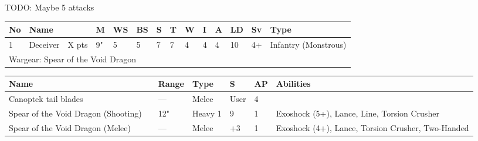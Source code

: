 \newpage
{}
TODO: Maybe 5 attacks

\noindent
\begin{tabular}{||m{10pt} m{95pt} m{30pt} m{11pt} m{11pt} m{11pt} m{11pt} m{11pt} m{11pt} m{11pt} m{11pt} m{11pt} m{11pt} m{125pt}||}
\hline
No & Name & & M & WS & BS & S & T & W & I & A & LD & Sv & Type \\
\hline
1 & Deceiver & X pts & 9" & 5 & 5 & 7 & 7 & 4 & 4 & 4 & 10 & 4+ & Infantry (Monstrous)\\
\hline
\hline
\multicolumn{14}{||Z{532 pt}||}{Wargear: Spear of the Void Dragon}\\
\hline
\end{tabular}

\noindent
\begin{tabular}{||m{140pt} m{0pt} m{31pt} m{55pt} m{12pt} m{12pt} m{210pt}||}
\hline
Name & & Range & Type & S & AP & Abilities \\
\hline
Canoptek tail blades & & — & Melee & User & 4 & \\
Spear of the Void Dragon (Shooting) &  & 12" & Heavy 1 & 9 & 1 & Exoshock (5+), Lance, Line, Torsion Crusher \\
Spear of the Void Dragon (Melee) &  & — & Melee & +3 & 1 & Exoshock (4+), Lance, Torsion Crusher, Two-Handed \\
\hline
\end{tabular}

